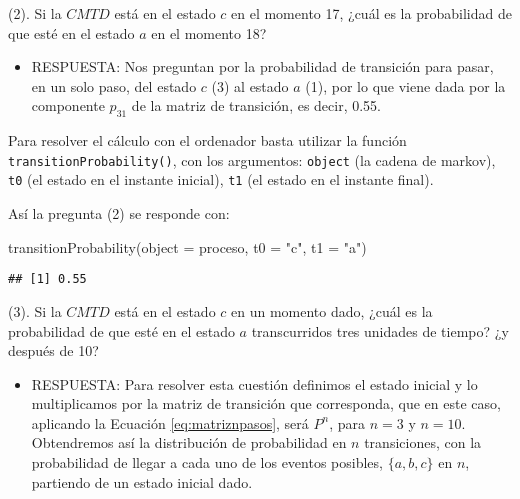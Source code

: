 \documentclass[
]{book}
\newenvironment{Shaded}{\begin{snugshade}}{\end{snugshade}}
\newcommand{\AttributeTok}[1]{\textcolor[rgb]{0.77,0.63,0.00}{#1}}
\newcommand{\FunctionTok}[1]{\textcolor[rgb]{0.00,0.00,0.00}{#1}}
\newcommand{\NormalTok}[1]{#1}
\newcommand{\StringTok}[1]{\textcolor[rgb]{0.31,0.60,0.02}{#1}}
\providecommand{\tightlist}{%
  \setlength{\itemsep}{0pt}\setlength{\parskip}{0pt}}
\newenvironment{whitebox}{
  \definecolor{shadecolor}{rgb}{255, 255, 255}  
  \color{black}
  \begin{shaded}}
 {\end{shaded}}
\theoremstyle{definition}
\theoremstyle{definition}
\theoremstyle{definition}
\theoremstyle{definition}
\theoremstyle{remark}
\begin{document}
(2). Si la \(CMTD\) está en el estado \(c\) en el momento 17, ¿cuál es la probabilidad de que esté en el estado \(a\) en el momento 18?

\begin{itemize}
\tightlist
\item
  RESPUESTA: Nos preguntan por la probabilidad de transición para pasar, en un solo paso, del estado \(c\) (3) al estado \(a\) (1), por lo que viene dada por la componente \(p_{31}\) de la matriz de transición, es decir, 0.55.
\end{itemize}

\begin{whitebox}
Para resolver el cálculo con el ordenador basta utilizar la función \texttt{transitionProbability()}, con los argumentos: \texttt{object} (la cadena de markov), \texttt{t0} (el estado en el instante inicial), \texttt{t1} (el estado en el instante final).

\end{whitebox}

Así la pregunta (2) se responde con:

\begin{Shaded}
\begin{Highlighting}[]
\FunctionTok{transitionProbability}\NormalTok{(}\AttributeTok{object =}\NormalTok{ proceso, }\AttributeTok{t0 =} \StringTok{"c"}\NormalTok{, }\AttributeTok{t1 =} \StringTok{"a"}\NormalTok{)}
\end{Highlighting}
\end{Shaded}

\begin{verbatim}
## [1] 0.55
\end{verbatim}

(3). Si la \(CMTD\) está en el estado \(c\) en un momento dado, ¿cuál es la probabilidad de que esté en el estado \(a\) transcurridos tres unidades de tiempo? ¿y después de 10?

\begin{itemize}
\tightlist
\item
  RESPUESTA: Para resolver esta cuestión definimos el estado inicial y lo multiplicamos por la matriz de transición que corresponda, que en este caso, aplicando la Ecuación \eqref{eq:matriznpasos}, será \(P^n\), para \(n=3\) y \(n=10\). Obtendremos así la distribución de probabilidad en \(n\) transiciones, con la probabilidad de llegar a cada uno de los eventos posibles, \(\{a,b,c\}\) en \(n\), partiendo de un estado inicial dado.
\end{itemize}
\end{document}
